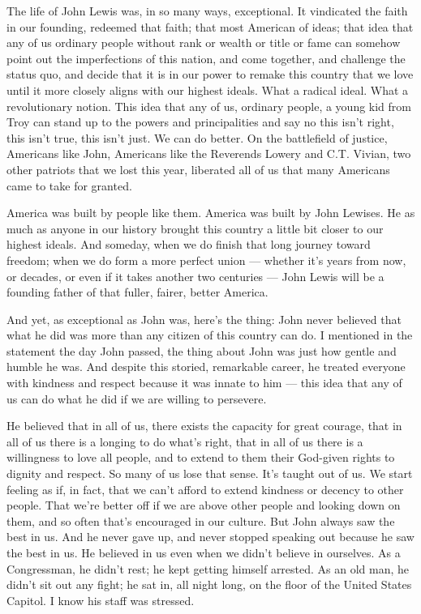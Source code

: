 The life of John Lewis was, in so many ways, exceptional. It vindicated
the faith in our founding, redeemed that faith; that most American of
ideas; that idea that any of us ordinary people without rank or wealth
or title or fame can somehow point out the imperfections of this nation,
and come together, and challenge the status quo, and decide that it is
in our power to remake this country that we love until it more closely
aligns with our highest ideals. What a radical ideal. What a
revolutionary notion. This idea that any of us, ordinary people, a young
kid from Troy can stand up to the powers and principalities and say no
this isn't right, this isn't true, this isn't just. We can do better. On
the battlefield of justice, Americans like John, Americans like the
Reverends Lowery and C.T. Vivian, two other patriots that we lost this
year, liberated all of us that many Americans came to take for granted.

America was built by people like them. America was built by John
Lewises. He as much as anyone in our history brought this country a
little bit closer to our highest ideals. And someday, when we do finish
that long journey toward freedom; when we do form a more perfect union
--- whether it's years from now, or decades, or even if it takes another
two centuries --- John Lewis will be a founding father of that fuller,
fairer, better America.

And yet, as exceptional as John was, here's the thing: John never
believed that what he did was more than any citizen of this country can
do. I mentioned in the statement the day John passed, the thing about
John was just how gentle and humble he was. And despite this storied,
remarkable career, he treated everyone with kindness and respect because
it was innate to him --- this idea that any of us can do what he did if
we are willing to persevere.

He believed that in all of us, there exists the capacity for great
courage, that in all of us there is a longing to do what's right, that
in all of us there is a willingness to love all people, and to extend to
them their God-given rights to dignity and respect. So many of us lose
that sense. It's taught out of us. We start feeling as if, in fact, that
we can't afford to extend kindness or decency to other people. That
we're better off if we are above other people and looking down on them,
and so often that's encouraged in our culture. But John always saw the
best in us. And he never gave up, and never stopped speaking out because
he saw the best in us. He believed in us even when we didn't believe in
ourselves. As a Congressman, he didn't rest; he kept getting himself
arrested. As an old man, he didn't sit out any fight; he sat in, all
night long, on the floor of the United States Capitol. I know his staff
was stressed.

